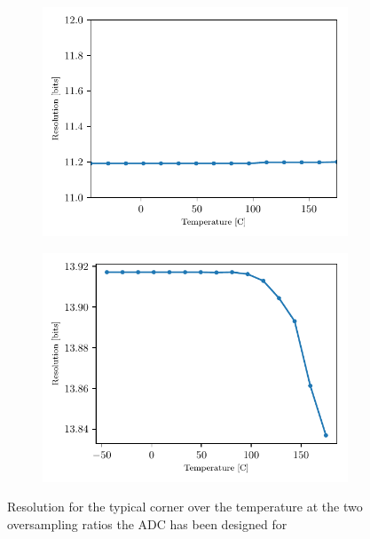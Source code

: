\begin{figure}[htp]
    \centering
    \begin{subfigure}[b]{0.48\textwidth}
        \includegraphics[width=\textwidth]{Chapter5/Figs/preliminary/adc_real_ota_osr5_temp.pdf}
    \end{subfigure}
    \begin{subfigure}[b]{0.48\textwidth}
        \includegraphics[width=\textwidth]{Chapter5/Figs/preliminary/adc_real_ota_osr6_temp.pdf}
    \end{subfigure}
    \caption{Resolution for the typical corner over the temperature at the two oversampling ratios the ADC has been designed for}
    \label{fig:adc-res-schematic-temp-tt}
\end{figure}

